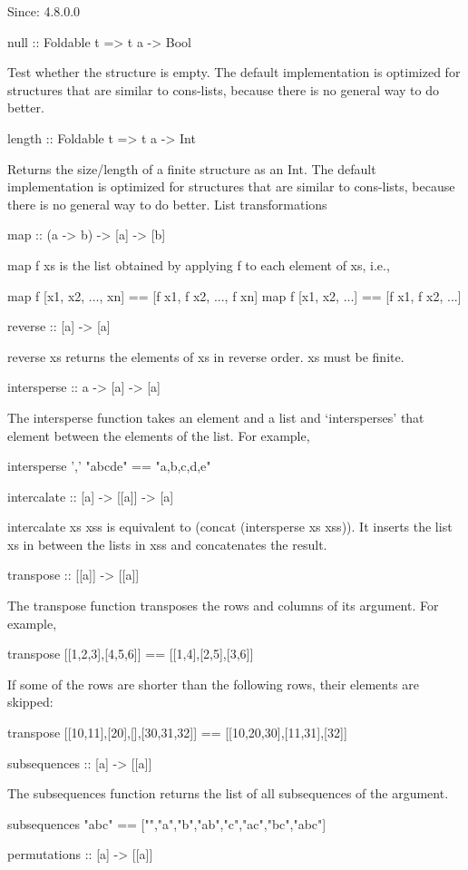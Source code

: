 Since: 4.8.0.0

null :: Foldable t => t a -> Bool

Test whether the structure is empty. The default implementation is optimized for structures that are similar to cons-lists, because there is no general way to do better.

length :: Foldable t => t a -> Int

Returns the size/length of a finite structure as an Int. The default implementation is optimized for structures that are similar to cons-lists, because there is no general way to do better.
List transformations

map :: (a -> b) -> [a] -> [b]

map f xs is the list obtained by applying f to each element of xs, i.e.,

map f [x1, x2, ..., xn] == [f x1, f x2, ..., f xn]
map f [x1, x2, ...] == [f x1, f x2, ...]

reverse :: [a] -> [a]

reverse xs returns the elements of xs in reverse order. xs must be finite.

intersperse :: a -> [a] -> [a]

The intersperse function takes an element and a list and `intersperses' that element between the elements of the list. For example,

intersperse ',' "abcde" == "a,b,c,d,e"

intercalate :: [a] -> [[a]] -> [a]

intercalate xs xss is equivalent to (concat (intersperse xs xss)). It inserts the list xs in between the lists in xss and concatenates the result.

transpose :: [[a]] -> [[a]]

The transpose function transposes the rows and columns of its argument. For example,

transpose [[1,2,3],[4,5,6]] == [[1,4],[2,5],[3,6]]

If some of the rows are shorter than the following rows, their elements are skipped:

transpose [[10,11],[20],[],[30,31,32]] == [[10,20,30],[11,31],[32]]

subsequences :: [a] -> [[a]]

The subsequences function returns the list of all subsequences of the argument.

subsequences "abc" == ["","a","b","ab","c","ac","bc","abc"]

permutations :: [a] -> [[a]]

